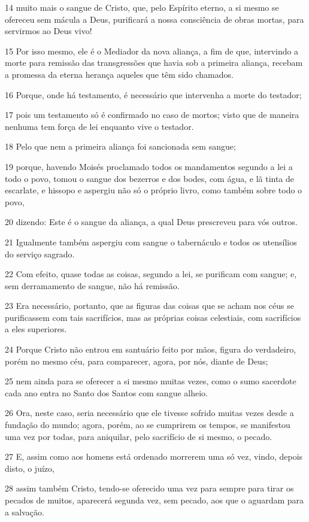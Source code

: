 \par 14 muito mais o sangue de Cristo, que, pelo Espírito eterno, a si mesmo se ofereceu sem mácula a Deus, purificará a nossa consciência de obras mortas, para servirmos ao Deus vivo!
\par 15 Por isso mesmo, ele é o Mediador da nova aliança, a fim de que, intervindo a morte para remissão das transgressões que havia sob a primeira aliança, recebam a promessa da eterna herança aqueles que têm sido chamados.
\par 16 Porque, onde há testamento, é necessário que intervenha a morte do testador;
\par 17 pois um testamento só é confirmado no caso de mortos; visto que de maneira nenhuma tem força de lei enquanto vive o testador.
\par 18 Pelo que nem a primeira aliança foi sancionada sem sangue;
\par 19 porque, havendo Moisés proclamado todos os mandamentos segundo a lei a todo o povo, tomou o sangue dos bezerros e dos bodes, com água, e lã tinta de escarlate, e hissopo e aspergiu não só o próprio livro, como também sobre todo o povo,
\par 20 dizendo: Este é o sangue da aliança, a qual Deus prescreveu para vós outros.
\par 21 Igualmente também aspergiu com sangue o tabernáculo e todos os utensílios do serviço sagrado.
\par 22 Com efeito, quase todas as coisas, segundo a lei, se purificam com sangue; e, sem derramamento de sangue, não há remissão.
\par 23 Era necessário, portanto, que as figuras das coisas que se acham nos céus se purificassem com tais sacrifícios, mas as próprias coisas celestiais, com sacrifícios a eles superiores.
\par 24 Porque Cristo não entrou em santuário feito por mãos, figura do verdadeiro, porém no mesmo céu, para comparecer, agora, por nós, diante de Deus;
\par 25 nem ainda para se oferecer a si mesmo muitas vezes, como o sumo sacerdote cada ano entra no Santo dos Santos com sangue alheio.
\par 26 Ora, neste caso, seria necessário que ele tivesse sofrido muitas vezes desde a fundação do mundo; agora, porém, ao se cumprirem os tempos, se manifestou uma vez por todas, para aniquilar, pelo sacrifício de si mesmo, o pecado.
\par 27 E, assim como aos homens está ordenado morrerem uma só vez, vindo, depois disto, o juízo,
\par 28 assim também Cristo, tendo-se oferecido uma vez para sempre para tirar os pecados de muitos, aparecerá segunda vez, sem pecado, aos que o aguardam para a salvação.

